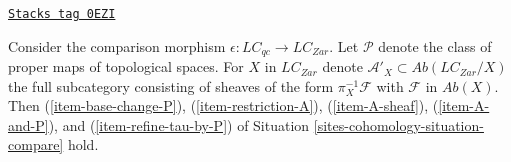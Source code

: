 \begin{lemma}
\label{sites-cohomology-lemma-compare-qc-zar}
\href{https://stacks.math.columbia.edu/tag/0EZI}{\texttt{Stacks tag 0EZI}}

Consider the comparison morphism
$\epsilon : \textit{LC}_{qc} \to \textit{LC}_{Zar}$.
Let $\mathcal{P}$ denote the class of proper maps of topological spaces.
For $X$ in $\textit{LC}_{Zar}$ denote
$\mathcal{A}'_X \subset \textit{Ab}(\textit{LC}_{Zar}/X)$
the full subcategory consisting of sheaves of the form
$\pi_X^{-1}\mathcal{F}$ with $\mathcal{F}$ in $\textit{Ab}(X)$.
Then
(\ref{item-base-change-P}),
(\ref{item-restriction-A}),
(\ref{item-A-sheaf}),
(\ref{item-A-and-P}), and
(\ref{item-refine-tau-by-P})
of Situation \ref{sites-cohomology-situation-compare} hold.
\end{lemma}

